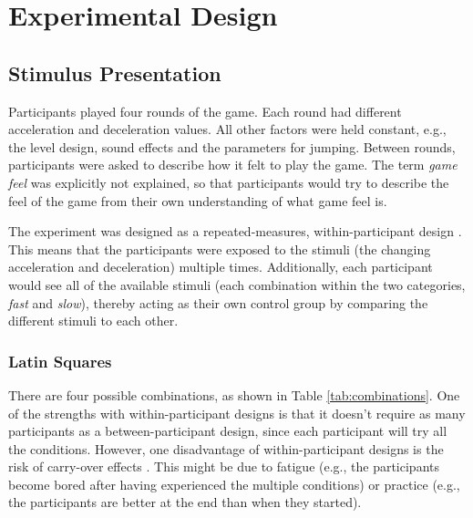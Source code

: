 \section{Experimental Design} \label{experimentalDesign}

\subsection{Stimulus Presentation}
Participants played four rounds of the game. Each round had different acceleration and deceleration values. All other factors were held constant, e.g., the level design, sound effects and the parameters for jumping. Between rounds, participants were asked to describe how it felt to play the game. The term \textit{game feel} was explicitly not explained, so that participants would try to describe the feel of the game from their own understanding of what game feel is.

The experiment was designed as a repeated-measures, within-participant design \cite{cunningham}. This means that the participants were exposed to the stimuli (the changing acceleration and deceleration) multiple times. Additionally, each participant would see all of the available stimuli (each combination within the two categories, \textit{fast} and \textit{slow}), thereby acting as their own control group by comparing the different stimuli to each other.

\subsubsection{Latin Squares} \label{latinSection}
There are four possible combinations, as shown in Table \ref{tab:combinations}. One of the strengths with within-participant designs is that it doesn't require as many participants as a between-participant design, since each participant will try all the conditions. However, one disadvantage of within-participant designs is the risk of carry-over effects \cite{experimental1}. This might be due to fatigue (e.g., the participants become bored after having experienced the multiple conditions) or practice (e.g., the participants are better at the end than when they started).

